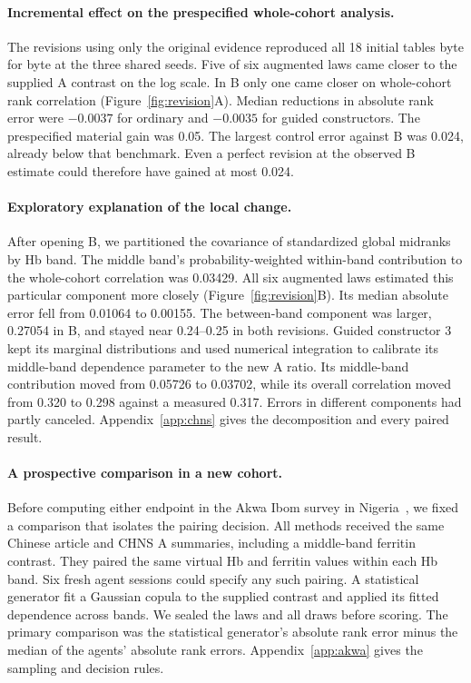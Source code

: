 \documentclass[sigconf,anonymous,review]{acmart}
\begin{document}
\paragraph{Incremental effect on the prespecified whole-cohort analysis.}
The revisions using only the original evidence reproduced all 18 initial tables byte for byte at the three shared seeds. Five of six augmented laws came closer to the supplied A contrast on the log scale. In B only one came closer on whole-cohort rank correlation (Figure~\ref{fig:revision}A). Median reductions in absolute rank error were $-0.0037$ for ordinary and $-0.0035$ for guided constructors. The prespecified material gain was 0.05. The largest control error against B was 0.024, already below that benchmark. Even a perfect revision at the observed B estimate could therefore have gained at most 0.024.

\paragraph{Exploratory explanation of the local change.}
After opening B, we partitioned the covariance of standardized global midranks by Hb band. The middle band's probability-weighted within-band contribution to the whole-cohort correlation was 0.03429. All six augmented laws estimated this particular component more closely (Figure~\ref{fig:revision}B). Its median absolute error fell from 0.01064 to 0.00155. The between-band component was larger, 0.27054 in B, and stayed near 0.24--0.25 in both revisions. Guided constructor 3 kept its marginal distributions and used numerical integration to calibrate its middle-band dependence parameter to the new A ratio. Its middle-band contribution moved from 0.05726 to 0.03702, while its overall correlation moved from 0.320 to 0.298 against a measured 0.317. Errors in different components had partly canceled. Appendix~\ref{app:chns} gives the decomposition and every paired result.

\paragraph{A prospective comparison in a new cohort.}
Before computing either endpoint in the Akwa Ibom survey in Nigeria~\cite{akwa_iron}, we fixed a comparison that isolates the pairing decision. All methods received the same Chinese article and CHNS A summaries, including a middle-band ferritin contrast. They paired the same virtual Hb and ferritin values within each Hb band. Six fresh agent sessions could specify any such pairing. A statistical generator fit a Gaussian copula to the supplied contrast and applied its fitted dependence across bands. We sealed the laws and all draws before scoring. The primary comparison was the statistical generator's absolute rank error minus the median of the agents' absolute rank errors. Appendix~\ref{app:akwa} gives the sampling and decision rules.
\end{document}
